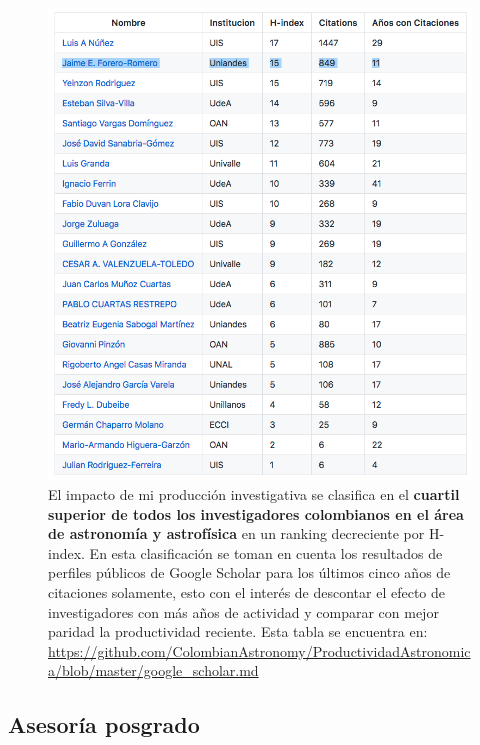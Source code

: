 \documentclass{article}
\begin{document}
\newpage

\begin{figure}[!h]
\begin{center}
\includegraphics[scale=0.45]{scholar_astronomia.png}
\caption{
El impacto de mi producci\'on investigativa se clasifica en el {\bf cuartil
  superior de todos los investigadores colombianos en el \'area de
  astronom\'ia y astrof\'isica} en 
  un ranking decreciente por H-index. 
  En esta clasificaci\'on se toman en cuenta los resultados de
  perfiles p\'ublicos de Google Scholar
  para los \'ultimos cinco a\~nos de citaciones solamente, esto con el
  inter\'es de descontar el efecto de investigadores con m\'as a\~nos de
  actividad y comparar con mejor paridad la productividad
  reciente. 
Esta tabla se encuentra en: 
\url{https://github.com/ColombianAstronomy/ProductividadAstronomica/blob/master/google_scholar.md}
\label{table:astro}}
\end{center}
\end{figure}

\newpage

\subsection{Asesor\'ia posgrado}
\end{document}
